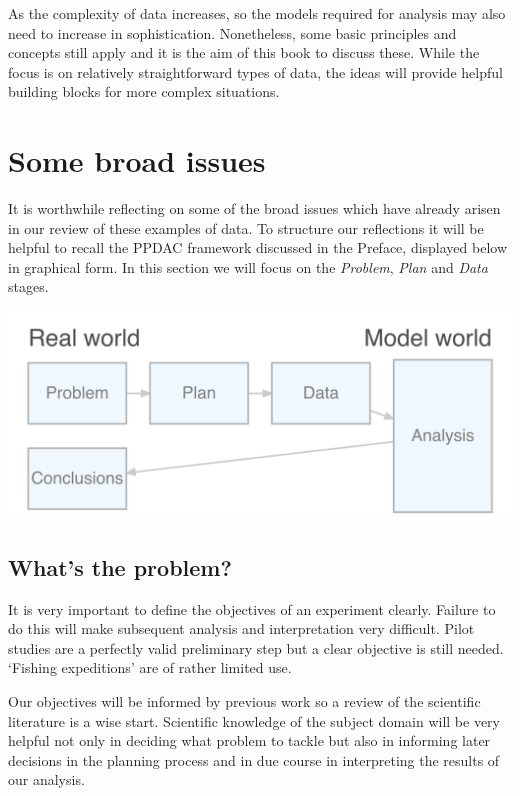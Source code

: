 \documentclass[
]{book}
\begin{document}
As the complexity of data increases, so the models required for analysis may also need to increase in sophistication. Nonetheless, some basic principles and concepts still apply and it is the aim of this book to discuss these. While the focus is on relatively straightforward types of data, the ideas will provide helpful building blocks for more complex situations.

\section{Some broad issues}\label{some-broad-issues}

It is worthwhile reflecting on some of the broad issues which have already arisen in our review of these examples of data. To structure our reflections it will be helpful to recall the PPDAC framework discussed in the Preface, displayed below in graphical form. In this section we will focus on the \emph{Problem}, \emph{Plan} and \emph{Data} stages.

\begin{center}\includegraphics[width=0.7\linewidth]{images/ppdac_1} \end{center}

\subsection{What's the problem?}\label{whats-the-problem}

It is very important to define the objectives of an experiment clearly. Failure to do this will make subsequent analysis and interpretation very difficult. Pilot studies are a perfectly valid preliminary step but a clear objective is still needed. `Fishing expeditions' are of rather limited use.

Our objectives will be informed by previous work so a review of the scientific literature is a wise start. Scientific knowledge of the subject domain will be very helpful not only in deciding what problem to tackle but also in informing later decisions in the planning process and in due course in interpreting the results of our analysis.
\end{document}
